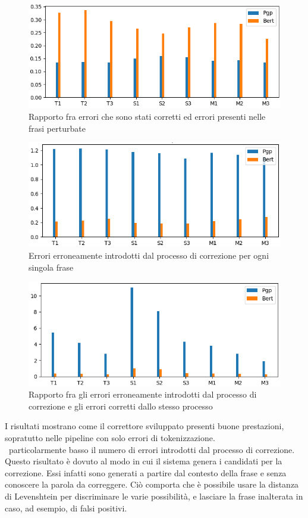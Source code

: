 \documentclass[12pt]{article}
\begin{document}
\begin{figure}[H]
\centering
\includegraphics[width=\textwidth]{immagini/cpp}
\caption{Rapporto fra errori che sono stati corretti ed errori presenti nelle frasi perturbate}
\end{figure}

\begin{figure}[H]
\centering
\includegraphics[width=\textwidth]{immagini/ips}
\caption{Errori erroneamente introdotti dal processo di correzione per ogni singola frase}
\end{figure}

\begin{figure}[H]
\centering
\includegraphics[width=\textwidth]{immagini/ipc}
\caption{Rapporto fra gli errori erroneamente introdotti dal processo di correzione e gli errori corretti dallo stesso processo}
\end{figure}

I risultati mostrano come il correttore sviluppato presenti buone prestazioni, sopratutto nelle pipeline con solo errori di tokenizzazione.\\
\E\ particolarmente basso il numero di errori introdotti dal processo di correzione. Questo risultato è dovuto al modo in cui il sistema genera i candidati per la correzione. Essi infatti sono generati a partire dal contesto della frase e senza conoscere la parola da correggere. Ciò comporta che è possibile usare la distanza di Levenshtein per discriminare le varie possibilità, e lasciare la frase inalterata in caso, ad esempio, di falsi positivi.
\end{document}
